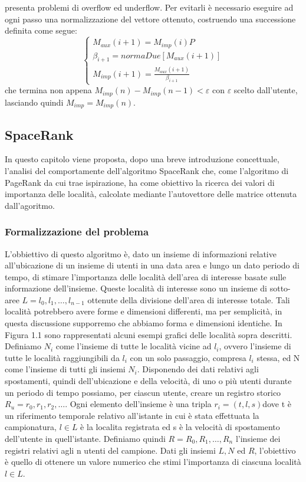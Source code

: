 presenta problemi di overflow ed underflow. Per evitarli \`e necessario
eseguire ad ogni passo una normalizzazione del vettore ottenuto, costruendo
una successione definita come segue:
\begin{equation}
\left\{\begin{matrix}
M_{aux}(i+1) = M_{imp}(i)P
\\ \beta_{i+1} = normaDue[M_{aux}(i+1)]
\\ M_{imp}(i+1) = \frac{M_{aux}(i+1)}{\beta_{i+1}}
\end{matrix}\right.
\end{equation}
che termina non appena $ M_{imp}(n) - M_{imp}(n- 1) < \varepsilon $ con $ \varepsilon $ scelto dall'utente,
lasciando quindi $ M_{imp} = M_{imp}(n) $.

\subsection{SpaceRank}
In questo capitolo viene proposta, dopo una breve introduzione concettuale, l'analisi
del comportamente dell'algoritmo SpaceRank \cite{cit_50} che, come l'algoritmo di
PageRank da cui trae ispirazione, ha come obiettivo la ricerca dei valori di importanza
delle localit\`a, calcolate mediante l'autovettore delle matrice ottenuta dall'agoritmo.

\subsubsection{Formalizzazione del problema}
L'obbiettivo di questo algoritmo \`e, dato un insieme di informazioni relative all'ubicazione
di un insieme di utenti in una data area e lungo un dato periodo di tempo, di stimare
l'importanza delle localit\`a dell'area di interesse basate sulle informazione dell'insieme.
Queste localit\`a di interesse sono un insieme di sotto-aree $L = l_{0},l_{1},\dots,l_{n-1}$
ottenute della divisione dell'area di interesse totale. Tali localit\`a potrebbero
avere forme e dimensioni differenti, ma per semplicit\`a, in questa discussione
supporremo che abbiamo forma e dimensioni identiche. In Figura 1.1 sono rappresentati
alcuni esempi grafici delle localit\`a sopra descritti.\\
Definiamo $N_{i}$ come l'insieme di tutte le localit\`a vicine ad $l_{i}$, ovvero l'insieme
di tutte le localit\`a raggiungibili da $l_{i}$ con un solo passaggio, compresa $l_{i}$ stessa,
ed N come l'insieme di tutti gli insiemi $N_{i}$. Disponendo dei dati relativi
agli spostamenti, quindi dell'ubicazione e della velocit\`a, di uno o pi\`u utenti
durante un periodo di tempo possiamo, per ciascun utente, creare un registro
storico $R_{u} = r_{0},r_{1},r_{2},\dots$. Ogni elemento dell'insieme \`e una tripla
$r_{i} = (t,l,s)$dove t \`e un riferimento temporale relativo all'istante in cui \`e
stata effettuata la campionatura, $l \in L$ \`e la localita registrata ed s \`e
la velocit\`a di spostamento dell'utente in quell'istante. Definiamo quindi $R = R_{0},R_{1},\dots,R_{n}$
l'insieme dei registri relativi agli n utenti del campione. Dati gli insiemi $L, N$ ed $R$, l'obiettivo \`e quello di ottenere
un valore numerico che stimi l'importanza di ciascuna localit\`a $l \in L$.

